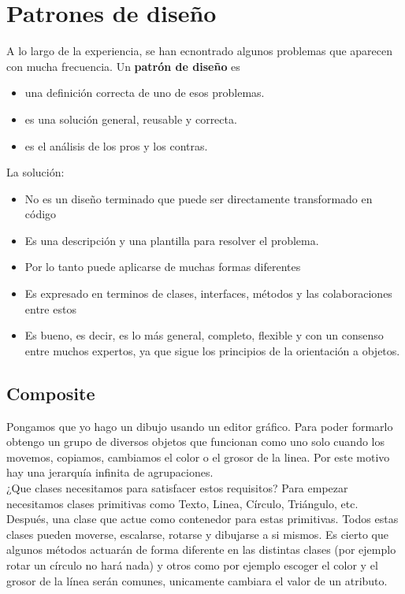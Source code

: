\documentclass[11pt]{article}
\theoremstyle{plain}
\begin{document}
    \section{Patrones de diseño} %
    \label{sec:patrones_de_diseño}
        A lo largo de la experiencia, se han ecnontrado algunos problemas que aparecen con mucha frecuencia. Un \textbf{patrón de diseño} es
        \begin{itemize}
            \item una definición correcta de uno de esos problemas.
            \item es una solución general, reusable y correcta.
            \item es el análisis de los pros y los contras.
        \end{itemize}

        La solución:
        \begin{itemize}
            \item No es un diseño terminado que puede ser directamente transformado en código
            \item Es una descripción y una plantilla para resolver el problema.
            \item Por lo tanto puede aplicarse de muchas formas diferentes
            \item Es expresado en terminos de clases, interfaces, métodos y las colaboraciones entre estos
            \item Es bueno, es decir, es lo más general, completo, flexible y con un consenso entre muchos expertos, ya que sigue los principios de la orientación a objetos.
        \end{itemize}
        \subsection{Composite} %
        \label{sub:composite}
            Pongamos que yo hago un dibujo usando un editor gráfico. Para poder formarlo obtengo un grupo de diversos objetos que funcionan como uno solo cuando los movemos, copiamos, cambiamos el color o el grosor de la linea. Por este motivo hay una jerarquía infinita de agrupaciones.\\

            ¿Que clases necesitamos para satisfacer estos requisitos? Para empezar necesitamos clases primitivas como Texto, Linea, Círculo, Triángulo, etc. Después, una clase que actue como contenedor para estas primitivas. Todos estas clases pueden moverse, escalarse, rotarse y dibujarse a si mismos. Es cierto que algunos métodos actuarán de forma diferente en las distintas clases (por ejemplo rotar un círculo no hará nada) y otros como por ejemplo escoger el color y el grosor de la línea serán comunes, unicamente cambiara el valor de un atributo.\\
\end{document}
